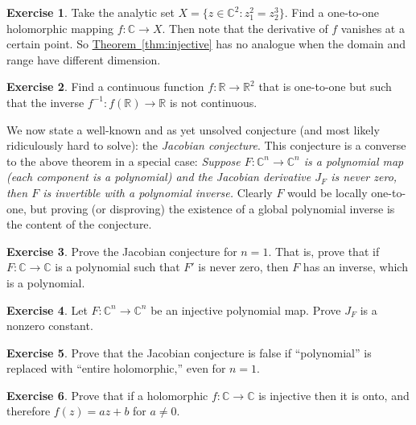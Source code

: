 \documentclass[12pt,openany]{book}
\newcommand{\C}{{\mathbb{C}}}
\newcommand{\R}{{\mathbb{R}}}
\newcommand{\myindex}[1]{#1\index{#1}}
\theoremstyle{plain}
\theoremstyle{remark}
\theoremstyle{definition}
\newenvironment{exbox}{%
    \def\FrameCommand{\vrule width 1pt \relax\hspace {10pt}}%
    \MakeFramed {\advance \hsize -\width \FrameRestore }%
}{%
    \endMakeFramed
}
\theoremstyle{exercise}
\newtheorem{exercise}{Exercise}[section]
\theoremstyle{example}
\newcommand{\thmref}[1]{\hyperref[#1]{Theorem~\ref*{#1}}}
\begin{document}
\begin{exbox}
\begin{exercise}
Take the analytic set
$X = \{ z \in \C^2 : z_1^2 = z_2^3 \}$.
Find a one-to-one holomorphic mapping $f \colon \C \to X$.
Then note that the derivative of $f$ vanishes at a certain point.
So \thmref{thm:injective} has no analogue when the domain and range have
different dimension.
\end{exercise}

\begin{exercise}
Find a continuous function $f \colon \R \to \R^2$ that is one-to-one but
such that the inverse $f^{-1} \colon f(\R) \to \R$ is not continuous.
\end{exercise}
\end{exbox}

We now state a well-known and as yet unsolved conjecture (and most
likely ridiculously hard to solve):
the \emph{\myindex{Jacobian conjecture}}.
This conjecture is a converse to the above
theorem in a special case:
\emph{Suppose $F \colon \C^n \to \C^n$ is a polynomial map (each component is a
polynomial) and the Jacobian derivative $J_F$ is never zero, then $F$ is
invertible with a polynomial inverse.}
Clearly $F$ would be locally one-to-one, but proving (or
disproving)
the existence of a global polynomial inverse is the content of the conjecture.

\begin{exbox}
\begin{exercise}
Prove the Jacobian conjecture for $n=1$.  That is, prove that if
$F \colon \C \to \C$ is a polynomial such that $F'$ is never zero,
then $F$ has an inverse, which is a polynomial.
\end{exercise}

\begin{exercise}
Let $F \colon \C^n \to \C^n$ be an injective polynomial map.
Prove $J_F$ is a nonzero constant.
\end{exercise}

\begin{exercise}
Prove that the Jacobian conjecture is false if
``polynomial'' is replaced with ``entire holomorphic,'' even for $n=1$.
\end{exercise}

\begin{exercise}
Prove that if a holomorphic $f \colon \C \to \C$ is injective then it is
onto, and therefore $f(z) = az + b$ for $a \not= 0$.
\end{exercise}
\end{exbox}
\end{document}
